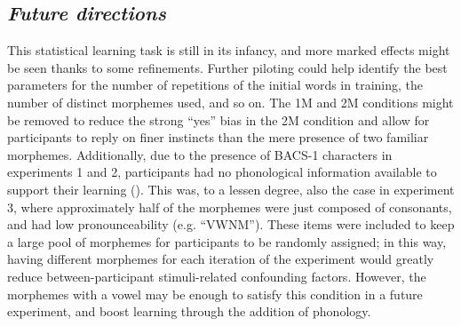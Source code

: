 \subsection{\large{\emph{Future directions}}}
\noindent
This statistical learning task is still in its infancy, and more marked effects might be seen thanks to some refinements. Further piloting could help identify the best parameters for the number of repetitions of the initial words in training, the number of distinct morphemes used, and so on. The 1M and 2M conditions might be removed to reduce the strong ``yes'' bias in the 2M condition and allow for participants to reply on finer instincts than the mere presence of two familiar morphemes. Additionally, due to the presence of BACS-1 characters in experiments 1 and 2, participants had no phonological information available to support their learning (\cite{Chetail2017}). This was, to a lessen degree, also the case in experiment 3, where approximately half of the morphemes were just composed of consonants, and had low pronounceability (e.g. ``VWNM''). These items were included to keep a large pool of morphemes for participants to be randomly assigned; in this way, having different morphemes for each iteration of the experiment would greatly reduce between-participant stimuli-related confounding factors. However, the morphemes with a vowel may be enough to satisfy this condition in a future experiment, and boost learning through the addition of phonology.
